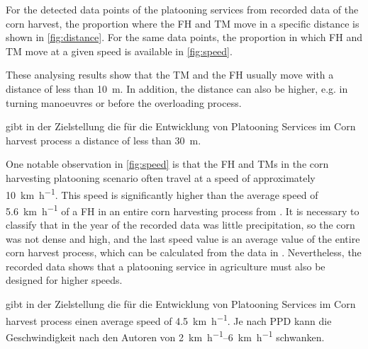 For the detected data points of the platooning services from recorded data of the corn harvest, the proportion where the \ac{FH} and \ac{TM} move in a specific distance is shown in \autoref{fig:distance}. For the same data points, the proportion in which \ac{FH} and \ac{TM} move at a given speed is available in \autoref{fig:speed}.

These analysing results show that the \ac{TM} and the \ac{FH} usually move with a distance of less than \SI{10}{\metre}. In addition, the distance can also be higher, e.g. in turning manoeuvres or before the overloading process.

\textcite{IVAN} gibt in der Zielstellung die für die Entwicklung von Platooning Services im Corn harvest process a distance of less  than \SI{30}{\metre}.


One notable observation in \autoref{fig:speed} is that the \ac{FH} and \ac{TM}s in the corn harvesting platooning scenario often travel at a speed of approximately \SI{10}{\kilo\metre\per\hour}. This speed is significantly higher than the average speed of \SI{5.6}{\kilo\metre\per\hour} of a \ac{FH} in an entire corn harvesting process from \cite{faustzahlen2018}. It is necessary to classify that in the year of the recorded data was little precipitation, so the corn was not dense and high, and the last speed value is an average value of the entire corn harvest process, which can be calculated from the data in \cite{faustzahlen2018}.
Nevertheless, the recorded data shows that a platooning service in agriculture must also be designed for higher speeds. 

\textcite{IVAN} gibt in der Zielstellung die für die Entwicklung von Platooning Services im Corn harvest process einen average speed of \SI{4.5}{\kilo\metre\per\hour}. Je nach \ac{PPD} kann die Geschwindigkeit nach den Autoren von \SIrange{2}{6}{\kilo\metre\per\hour} schwanken. 


